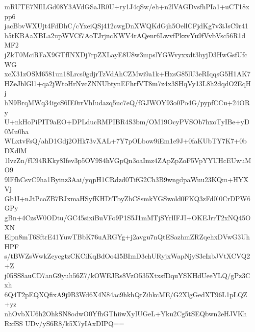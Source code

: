 mRUTE7NIlLGd08Y3AVdGSaJR0U+ry1J4qSw/eh+n2lVAGDvsfhPIa1+uCT18xpp6
jacBbvWXUjt4FdDhC/cYxeiQSj412cwgDnXWQKdGjh5OellCFjdKg7v3iJsC9r41
h5tKBAaXBLa2upWVCf7AoTJrjncKWV4rAQenr6LwvfPkzvYu9fVvbVsc56R1dMF2
jZkT0MciRFaX9GTfINXDj7rpZXLayE8U8w3mpslYGWvyxxdt3hyjD3HwGsfUfcWG
xcX31zOSM6581un18Lrcs0gdjrTzVdAhCZMwi9a1k+HxsG85lU3eRIqqsG5H1AK7
HZeJblGl1+qa2jWtoHrNvcZNNUbtynEFhrfVT8m7z4x3SHqVy13L8h2dqdO2EqHj
hN9BrqMWq34igcS6IE0rrVhIudazq5uc7eQ/fGJWOY93o0Po4G/pypfCCu+24ORy
U+nkHoPiPIT9aEO+DPLducRMPIBR4S3bm/OM19OcyPVSOb7hxoTyIBe+yD0Mu0ha
WLxtvFsQ/ahD1Gdj2OHk73vXAL+7Y7pOLbow9iEm1e9J+0faKUbTY7K7+0bDXdlM
1lvzZn/fU94RKky8Ifev3p5OV9S4hVGpQn3oaImz4ZApZpZoF5VpYYUHcEUwuMO9
9lFfhCsvC9ha1Byinz3Aai/yqpH1CRdzd0TifG2Ch3B9wngdpaWuu23KQm+HYXVj
Gb1I+nJtPcoZB7BJxmaHSyfKHDiTbyZbC8smkYGSwold0FKQ3zFd0l0CrDPW6GPy
gBn+4CzsW0ODtu/GC45sixiBuVFo9P1S5J1mMTjSYrlIFJI+OKEJrrT2xNQ45OXN
Elpn8mT6SftrE41YuwTBbK76uARGYg+j2avgu7nQtESazhmZRZqehxDVwG3UhHPF
s/tBWZsWwkZcycgtzCKCiKqBdOo4I5BImD3chURyjxWapNjyS3eIzbJVtXCVQ2+Z
j05SS8auCD7anG9yuh56Z7/kOWEJRs8VzO535XtxsfDquYSKHdUeeYLQ/gPz3Cxh
6Q4T2pEQXQfixA9j9B3Wd6X4N84ac9hkhQtZihkcME/G2XlgGedXT96L1pLQZ+yz
nhOvbXU6h2OhkSN8odwO0YfhGThiiwXyIUGeL+Yku2Cg5tSEQbwn2eHJVKhRxfSS
UDv/yS6R8/k5X7yIAxDIPQ==
